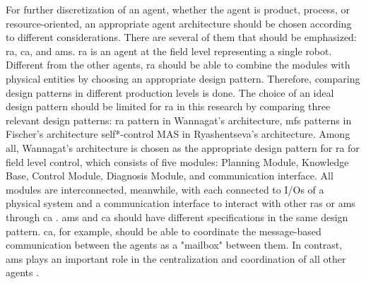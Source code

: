 For further discretization of an agent, whether the agent is product, 
process, or resource-oriented, an appropriate agent architecture should 
be chosen according to different considerations. There are several of 
them that should be emphasized: \gls{ra}, \gls{ca}, and \gls{ams}. 
\gls{ra} is an agent at the field level representing a single robot. 
Different from the other agents, \gls{ra} should be able to combine 
the modules with physical entities by choosing an appropriate design 
pattern. Therefore, comparing design patterns in different production 
levels is done\cite{ocker_leveraging_2021}. The choice of an ideal 
design pattern should be limited for \gls{ra} in this research by 
comparing three relevant design patterns:  \gls{ra} pattern in Wannagat’s 
architecture, \gls{mfs} patterns in Fischer’s architecture self*-control 
MAS in Ryashentseva’s architecture. Among all,  Wannagat’s architecture 
is chosen as the appropriate design pattern for \gls{ra} for field level 
control, which consists of five modules: Planning Module, Knowledge Base, 
Control Module, Diagnosis Module, and communication interface. 
All modules are interconnected, meanwhile, with each connected to 
I/Os of a physical system and a communication interface to interact 
with other \gls{ras} or \gls{ams} through \gls{ca} \cite{cruz_salazar_cyber-physical_2019}. 
\gls{ams} and \gls{ca} should have different specifications in the 
same design pattern. \gls{ca}, for example, should be able to coordinate 
the message-based communication between the agents as a "mailbox" 
between them. In contrast, \gls{ams} plays an important role in the 
centralization and coordination of all other agents \cite{wannagat_entwicklung_2010}. 




